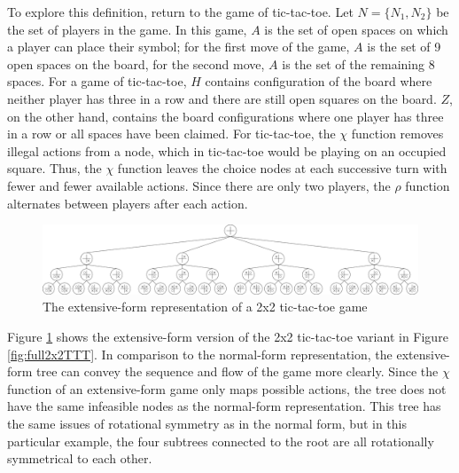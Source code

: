 To explore this definition, return to the game of tic-tac-toe. Let $N=\{N_1, N_2\}$ be the set of players in the game. In this game, $A$ is the set of open spaces on which a player can place their symbol; for the first move of the game, $A$ is the set of 9 open spaces on the board, for the second move, $A$ is the set of the remaining 8 spaces. For a game of tic-tac-toe, $H$ contains configuration of the board where neither player has three in a row and there are still open squares on the board. $Z$, on the other hand, contains the board configurations where one player has three in a row or all spaces have been claimed. For tic-tac-toe, the $\chi$ function removes illegal actions from a node, which in tic-tac-toe would be playing on an occupied square. Thus, the $\chi$ function leaves the choice nodes at each successive turn with fewer and fewer available actions. Since there are only two players, the $\rho$ function alternates between players after each action.

\begin{figure}[H]
  \centering
  \includegraphics[width=16cm]{figures/TTTExtTree.png}
  \caption{The extensive-form representation of a 2x2 tic-tac-toe game}
  \label{fig:2x2TTTExtForm}
\end{figure}

Figure \ref{fig:2x2TTTExtForm} shows the extensive-form version of the 2x2 tic-tac-toe variant in Figure \ref{fig:full2x2TTT}. In comparison to the normal-form representation, the extensive-form tree can convey the sequence and flow of the game more clearly. Since the $\chi$ function of an extensive-form game only maps possible actions, the tree does not have the same infeasible nodes as the normal-form representation. This tree has the same issues of rotational symmetry as in the normal form, but in this particular example, the four subtrees connected to the root are all rotationally symmetrical to each other.

